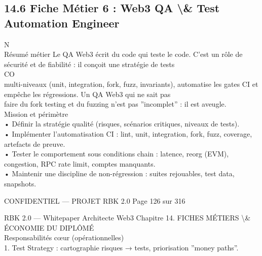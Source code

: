 \subsection{14.6 Fiche Métier 6 : Web3 QA \textbackslash{}& Test Automation Engineer}
\vspace{0.5em}
N\\
Résumé métier Le QA Web3 écrit du code qui teste le code. C’est un rôle de sécurité et de fiabilité : il conçoit une stratégie de tests\\
CO\\
multi-niveaux (unit, integration, fork, fuzz, invariants), automatise les gates CI et empêche les régressions. Un QA Web3 qui ne sait pas\\
faire du fork testing et du fuzzing n’est pas ”incomplet” : il est aveugle.\\
\vspace{0.5em}
Mission et périmètre\\
\vspace{0.5em}
• Définir la stratégie qualité (risques, scénarios critiques, niveaux de tests).\\
\vspace{0.5em}
• Implémenter l’automatisation CI : lint, unit, integration, fork, fuzz, coverage, artefacts de preuve.\\
\vspace{0.5em}
• Tester le comportement sous conditions chain : latence, reorg (EVM), congestion, RPC rate limit, comptes manquants.\\
\vspace{0.5em}
• Maintenir une discipline de non-régression : suites rejouables, test data, snapshots.\\
\vspace{0.5em}
\vspace{0.5em}
\begin{confidential}CONFIDENTIEL — PROJET RBK 2.0                                  Page 126 sur 316\end{confidential}
RBK 2.0 — Whitepaper Architecte Web3                                                  Chapitre 14. FICHES MÉTIERS \textbackslash{}& ÉCONOMIE DU DIPLÔMÉ\\
\vspace{0.5em}
\vspace{0.5em}
Responsabilités cœur (opérationnelles)\\
1. Test Strategy : cartographie risques → tests, priorisation ”money paths”.\\
\vspace{0.5em}
